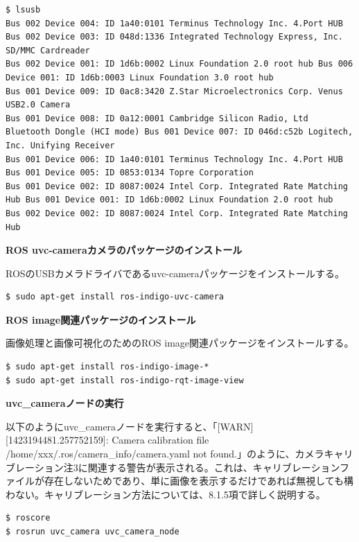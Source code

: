 \begin{lstlisting}[language=ROS]
$ lsusb
Bus 002 Device 004: ID 1a40:0101 Terminus Technology Inc. 4.Port HUB
Bus 002 Device 003: ID 048d:1336 Integrated Technology Express, Inc. SD/MMC Cardreader
Bus 002 Device 001: ID 1d6b:0002 Linux Foundation 2.0 root hub Bus 006 Device 001: ID 1d6b:0003 Linux Foundation 3.0 root hub
Bus 001 Device 009: ID 0ac8:3420 Z.Star Microelectronics Corp. Venus USB2.0 Camera
Bus 001 Device 008: ID 0a12:0001 Cambridge Silicon Radio, Ltd Bluetooth Dongle (HCI mode) Bus 001 Device 007: ID 046d:c52b Logitech, Inc. Unifying Receiver
Bus 001 Device 006: ID 1a40:0101 Terminus Technology Inc. 4.Port HUB Bus 001 Device 005: ID 0853:0134 Topre Corporation
Bus 001 Device 002: ID 8087:0024 Intel Corp. Integrated Rate Matching Hub Bus 001 Device 001: ID 1d6b:0002 Linux Foundation 2.0 root hub
Bus 002 Device 002: ID 8087:0024 Intel Corp. Integrated Rate Matching Hub
\end{lstlisting}

\textbf{ROS uvc-cameraカメラのパッケージのインストール}

ROSのUSBカメラドライバであるuvc-cameraパッケージをインストールする。

\begin{lstlisting}[language=ROS]
$ sudo apt-get install ros-indigo-uvc-camera
\end{lstlisting}

\textbf{ROS image関連パッケージのインストール}

画像処理と画像可視化のためのROS image関連パッケージをインストールする。

\begin{lstlisting}[language=ROS]
$ sudo apt-get install ros-indigo-image-*
$ sudo apt-get install ros-indigo-rqt-image-view
\end{lstlisting}

\textbf{uvc\_cameraノードの実行}

以下のようにuvc\_cameraノードを実行すると、「[WARN] [1423194481.257752159]: Camera calibration file /home/xxx/.ros/camera\_info/camera.yaml not found.」のように、カメラキャリブレーション注3に関連する警告が表示される。これは、キャリブレーションファイルが存在しないためであり、単に画像を表示するだけであれば無視しても構わない。キャリブレーション方法については、8.1.5項で詳しく説明する。

\begin{lstlisting}[language=ROS]
$ roscore
$ rosrun uvc_camera uvc_camera_node
\end{lstlisting}

